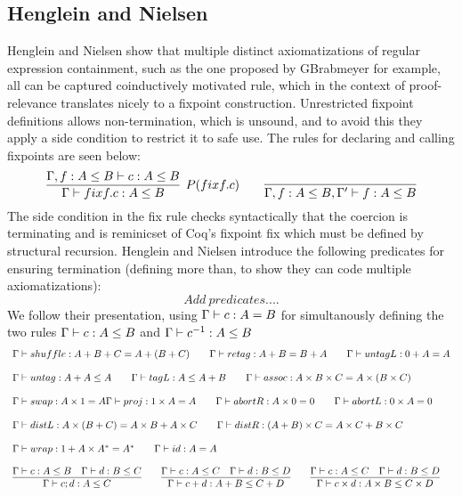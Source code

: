 \documentclass[a4paper,UKenglish,cleveref, autoref, thm-restate]{lipics-v2021}
\begin{document}
\subsection{Henglein and Nielsen}
Henglein and Nielsen show that multiple distinct axiomatizations of regular expression containment, such as the one proposed by GBrabmeyer for example, all can be captured coinductively motivated rule, which in the context of proof-relevance translates nicely to a fixpoint construction. Unrestricted fixpoint definitions allows non-termination, which is unsound, and to avoid this they apply a side condition to restrict it to safe use. The rules for declaring and calling fixpoints are seen below:
\begin{displaymath}
\infer[P(\fix f.c)]{ \containsG{\fix f.c}{A}{B}}{\contains{\Gamma,f : A \leq B}{c}{A}{B}} \qquad
 \infer{\contains{\Gamma ,f : A \leq B, \Gamma'}{ f}{A}{B}}{}
\end{displaymath}
The side condition in the fix rule checks syntactically that the coercion is terminating and is reminicset of Coq's fixpoint \textsf{fix} which must be defined by structural recursion. Henglein and Nielsen introduce the following predicates for ensuring termination (defining more than, to show they can code multiple axiomatizations):
\begin{displaymath}
Add~predicates....
\end{displaymath}
We follow their presentation, using $\myaxiomC{c}{A}{B}$ for simultanously defining the two rules  $\containsG{c}{A}{B}$ and  $\containsG{c^{-1}}{A}{B}$
\begin{displaymath}
\begin{array}{lll}
\myaxiomC{shuffle}{A + B + C}{A + (B + C)} \qquad  
\myaxiomC{retag}{A + B}{B + A} \qquad 
\myaxiomC{untagL}{0 + A}{A} 
\\\\
\containsG{untag}{A + A}{A}   \qquad \containsG{tagL}{A}{A + B} \qquad

\myaxiomC{assoc}{A \times B \times C}{A \times (B \times C)}
\\\\
\myaxiomC{swap}{A \times 1}{A} 
\myaxiomC{proj}{1 \times A}{A} \qquad
\myaxiomC{abortR}{A \times 0}{0} \qquad
\myaxiomC{abortL}{0 \times A}{0} 
\\\\
\myaxiomC{distL}{A \times (B + C)} {A \times B + A \times C} \qquad
\myaxiomC{distR}{(A + B)\times C}{A \times C + B \times C} 
\\\\
\myaxiomC{wrap}{1 + A \times A^*}{A^* } \qquad \myaxiomC{id}{A}{A}
\\\\
\infer{\containsG{c;d}{A}{C}}{\containsG{c}{A}{B} & \containsG{d}{B}{C}} \qquad

\infer{\containsG{c + d}{A + B}{ C + D}}{\containsG{c}{A}{C} & \containsG{d}{B}{D}}  \qquad

\infer{\containsG{c \times d}{A \times B}{ C \times D}}{\containsG{c}{A}{C} & \containsG{d}{B}{D}} 
\end{array}
\end{displaymath}
\end{document}

